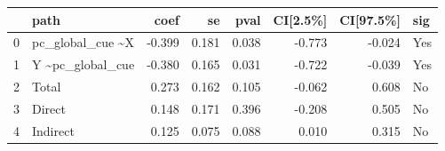 \begin{tabular}{llrrrrrl}
\toprule
{} &               path &   coef &     se &   pval &  CI[2.5\%] &  CI[97.5\%] &  sig \\
\midrule
0 &  pc\_global\_cue \textasciitilde  X & -0.399 &  0.181 &  0.038 &    -0.773 &     -0.024 &  Yes \\
1 &  Y \textasciitilde  pc\_global\_cue & -0.380 &  0.165 &  0.031 &    -0.722 &     -0.039 &  Yes \\
2 &              Total &  0.273 &  0.162 &  0.105 &    -0.062 &      0.608 &   No \\
3 &             Direct &  0.148 &  0.171 &  0.396 &    -0.208 &      0.505 &   No \\
4 &           Indirect &  0.125 &  0.075 &  0.088 &     0.010 &      0.315 &   No \\
\bottomrule
\end{tabular}

